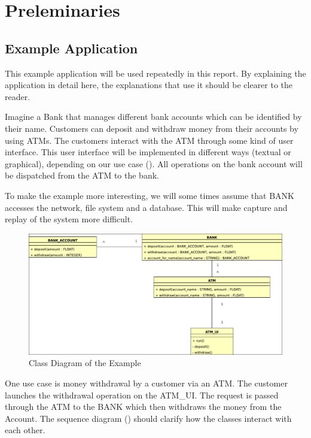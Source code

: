 \chapter{Preleminaries}
\section{Example Application}
This example application will be used repeatedly in this report. By explaining the application in detail here, the explanations that use it should be clearer to the reader.

Imagine a Bank that manages different bank accounts which can be identified by their name. Customers can deposit and withdraw money from their accounts by using ATMs. The customers interact with the ATM through some kind of user interface. This user interface will be implemented in different ways (textual or graphical), depending on our use case (). All operations on the bank account will be dispatched from the ATM to the bank. 

To make the example more interesting, we will some times assume that BANK accesses the network, file system and a database. This will make capture and replay of the system more difficult. %

 \begin{figure}[ht]
   \centering
   \includegraphics[width=1\textwidth]{illustrations/example_class_diagram}
   \caption{Class Diagram of the Example}
   \label{fig:example_withdraw_sequence}
\end{figure}

One use case is money withdrawal by a customer via an ATM. The customer launches the withdrawal operation on the ATM\_UI. The request is passed through the ATM to the BANK which then withdraws the money from the Account. The sequence diagram () should clarify how the classes interact with each other.


